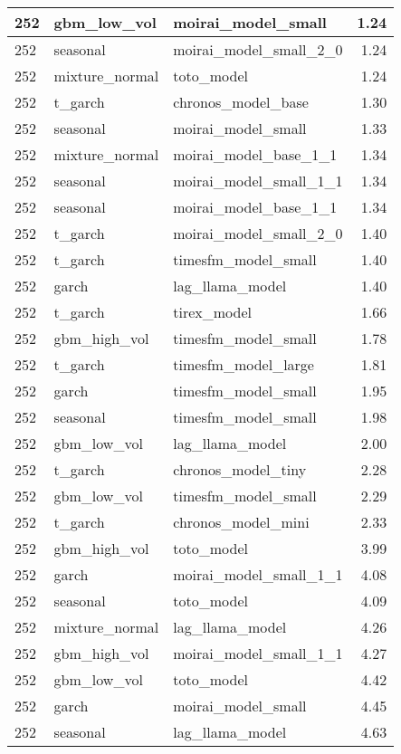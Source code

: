 {\begin{tabular}{lllr}
\midrule
252 & gbm\_low\_vol & moirai\_model\_small & 1.24 \\
\midrule
252 & seasonal & moirai\_model\_small\_2\_0 & 1.24 \\
\midrule
252 & mixture\_normal & toto\_model & 1.24 \\
\midrule
252 & t\_garch & chronos\_model\_base & 1.30 \\
\midrule
252 & seasonal & moirai\_model\_small & 1.33 \\
\midrule
252 & mixture\_normal & moirai\_model\_base\_1\_1 & 1.34 \\
\midrule
252 & seasonal & moirai\_model\_small\_1\_1 & 1.34 \\
\midrule
252 & seasonal & moirai\_model\_base\_1\_1 & 1.34 \\
\midrule
252 & t\_garch & moirai\_model\_small\_2\_0 & 1.40 \\
\midrule
252 & t\_garch & timesfm\_model\_small & 1.40 \\
\midrule
252 & garch & lag\_llama\_model & 1.40 \\
\midrule
252 & t\_garch & tirex\_model & 1.66 \\
\midrule
252 & gbm\_high\_vol & timesfm\_model\_small & 1.78 \\
\midrule
252 & t\_garch & timesfm\_model\_large & 1.81 \\
\midrule
252 & garch & timesfm\_model\_small & 1.95 \\
\midrule
252 & seasonal & timesfm\_model\_small & 1.98 \\
\midrule
252 & gbm\_low\_vol & lag\_llama\_model & 2.00 \\
\midrule
252 & t\_garch & chronos\_model\_tiny & 2.28 \\
\midrule
252 & gbm\_low\_vol & timesfm\_model\_small & 2.29 \\
\midrule
252 & t\_garch & chronos\_model\_mini & 2.33 \\
\midrule
252 & gbm\_high\_vol & toto\_model & 3.99 \\
\midrule
252 & garch & moirai\_model\_small\_1\_1 & 4.08 \\
\midrule
252 & seasonal & toto\_model & 4.09 \\
\midrule
252 & mixture\_normal & lag\_llama\_model & 4.26 \\
\midrule
252 & gbm\_high\_vol & moirai\_model\_small\_1\_1 & 4.27 \\
\midrule
252 & gbm\_low\_vol & toto\_model & 4.42 \\
\midrule
252 & garch & moirai\_model\_small & 4.45 \\
\midrule
252 & seasonal & lag\_llama\_model & 4.63 \\
\bottomrule
\end{tabular}
}